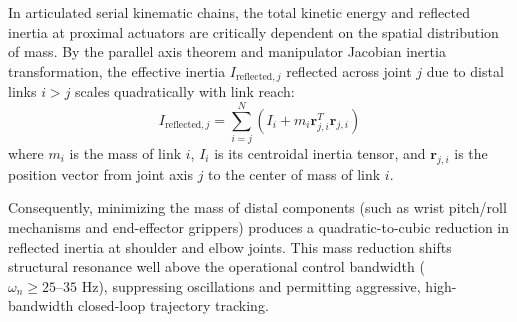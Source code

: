 In articulated serial kinematic chains, the total kinetic energy and reflected inertia at proximal actuators are critically dependent on the spatial distribution of mass. By the parallel axis theorem and manipulator Jacobian inertia transformation, the effective inertia $I_{\text{reflected}, j}$ reflected across joint $j$ due to distal links $i > j$ scales quadratically with link reach:
\begin{equation}
I_{\text{reflected}, j} = \sum_{i=j}^{N} \left( I_i + m_i \mathbf{r}_{j,i}^T \mathbf{r}_{j,i} \right)
\label{eq:reflected_inertia}
\end{equation}
where $m_i$ is the mass of link $i$, $I_i$ is its centroidal inertia tensor, and $\mathbf{r}_{j,i}$ is the position vector from joint axis $j$ to the center of mass of link $i$. 

Consequently, minimizing the mass of distal components (such as wrist pitch/roll mechanisms and end-effector grippers) produces a quadratic-to-cubic reduction in reflected inertia at shoulder and elbow joints. This mass reduction shifts structural resonance well above the operational control bandwidth ($\omega_n \ge 25\text{--}35\text{ Hz}$), suppressing oscillations and permitting aggressive, high-bandwidth closed-loop trajectory tracking.

